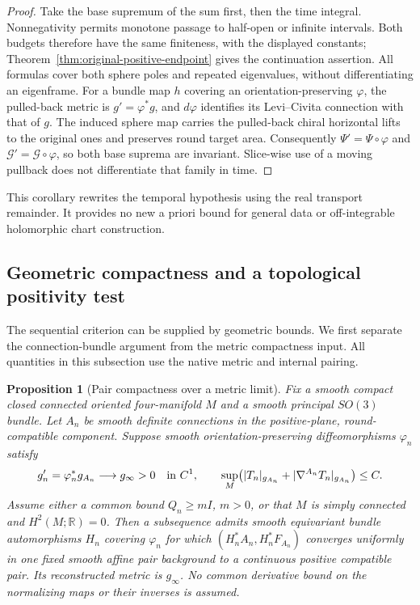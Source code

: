 \documentclass[11pt]{article}
\numberwithin{equation}{section}
\newtheorem{proposition}[theorem]{Proposition}
\theoremstyle{definition}
\theoremstyle{remark}
\begin{document}
\begin{proof}
Take the base supremum of the sum first, then the
time integral. Nonnegativity permits monotone passage
to half-open or infinite intervals. Both budgets
therefore have the same finiteness, with the displayed
constants; Theorem~\ref{thm:original-positive-endpoint}
gives the continuation assertion. All formulas cover
both sphere poles and repeated eigenvalues, without
differentiating an eigenframe. For a bundle map \(h\)
covering an orientation-preserving \(\varphi\), the
pulled-back metric is \(g'=\varphi^*g\), and
\(d\varphi\) identifies its Levi--Civita connection
with that of \(g\). The induced sphere map carries
the pulled-back chiral horizontal lifts to the original
ones and preserves round target area. Consequently
\(\Psi'=\Psi\circ\varphi\) and
\(\mathcal G'=\mathcal G\circ\varphi\), so both
base suprema are invariant. Slice-wise use of a moving
pullback does not differentiate that family in time.
\end{proof}

This corollary rewrites the temporal hypothesis using
the real transport remainder. It provides no new
a priori bound for general data or off-integrable
holomorphic chart construction.



\subsection{Geometric compactness and a topological positivity test}
\label{subsec:geometric-continuation}

The sequential criterion can be supplied by geometric bounds.
We first separate the connection-bundle argument from the
metric compactness input. All quantities in this subsection
use the native metric and internal pairing.

\begin{proposition}[Pair compactness over a metric limit]
\label{prop:metric-pair-compactness}
Fix a smooth compact closed connected oriented four-manifold
\(M\) and a smooth principal \(SO(3)\) bundle. Let \(A_n\)
be smooth definite connections in the positive-plane,
round-compatible component. Suppose smooth
orientation-preserving diffeomorphisms \(\varphi_n\) satisfy
\[
 g'_n=\varphi_n^*g_{A_n}\longrightarrow g_\infty>0
                   \quad\hbox{in }C^1,
 \qquad
 \sup_M\bigl(|T_n|_{g_{A_n}}+
             |\nabla^{A_n}T_n|_{g_{A_n}}\bigr)\le C.
\]
Assume either a common bound \(Q_n\ge mI\), \(m>0\), or
that \(M\) is simply connected and \(H^2(M;\mathbb R)=0\).
Then a subsequence admits smooth equivariant bundle
automorphisms \(H_n\) covering \(\varphi_n\) for which
\((H_n^*A_n,H_n^*F_{A_n})\) converges uniformly in one fixed
smooth affine pair background to a continuous positive
compatible pair. Its reconstructed metric is \(g_\infty\).
No common derivative bound on the normalizing maps or
their inverses is assumed.
\end{proposition}
\end{document}
